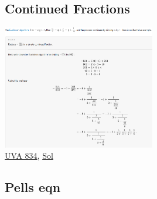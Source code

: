 \documentclass[8pt, a4paper, oneside, twocolumn]{extarticle}
\begin{document}
\subsection{Continued Fractions}
\includegraphics[width=0.5\textwidth,height=0.5\textheight,keepaspectratio]{confr}
\\\href{https://uva.onlinejudge.org/external/8/834.pdf}{UVA 834}, \href{https://github.com/sourabh2311/Competitive-Programming/blob/master/UVA_834.cpp}{Sol}
\subsection{Pells eqn}
\end{document}
